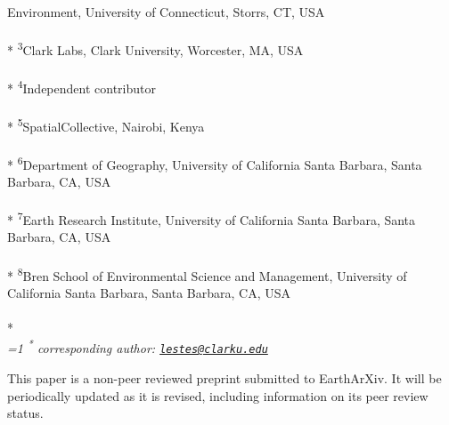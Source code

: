\documentclass[11pt,a4paper]{article}
\begin{document}
\begin{singlespace}
\begin{justify}
Environment, University of Connecticut, Storrs, CT, USA\\\\*
\footnotesize\textsuperscript{3}Clark Labs, Clark University, Worcester,
MA, USA\\\\*
\footnotesize\textsuperscript{4}Independent contributor\\\\*
\footnotesize\textsuperscript{5}SpatialCollective, Nairobi, Kenya\\\\*
\footnotesize\textsuperscript{6}Department of Geography, University of
California Santa Barbara, Santa Barbara, CA, USA\\\\*
\footnotesize\textsuperscript{7}Earth Research Institute, University of
California Santa Barbara, Santa Barbara, CA, USA\\\\*
\footnotesize\textsuperscript{8}Bren School of Environmental Science and
Management, University of California Santa Barbara, Santa Barbara, CA,
USA\\\\*
\setcounter{num}{1}
\\[0.1cm]
\footnotesize \emph{
\ifnum\value{num}=1%
\textsuperscript{*} corresponding author:
\fi
\href{mailto:lestes@clarku.edu}{\nolinkurl{lestes@clarku.edu}}
}

This paper is a non-peer reviewed preprint submitted to EarthArXiv. It
will be periodically updated as it is revised, including information on
its peer review status.


\end{justify}
\normalsize


\end{singlespace}
\end{document}
